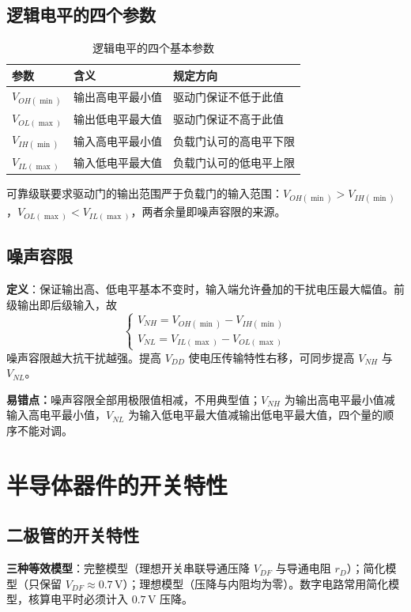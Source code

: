 \subsection{逻辑电平的四个参数}
\begin{table}[!htbp]
    \centering
    \caption{逻辑电平的四个基本参数}
    \begin{tabular}{lll}
        \toprule
        参数 & 含义 & 规定方向 \\
        \midrule
        \(V_{OH(\min)}\) & 输出高电平最小值 & 驱动门保证不低于此值 \\
        \(V_{OL(\max)}\) & 输出低电平最大值 & 驱动门保证不高于此值 \\
        \(V_{IH(\min)}\) & 输入高电平最小值 & 负载门认可的高电平下限 \\
        \(V_{IL(\max)}\) & 输入低电平最大值 & 负载门认可的低电平上限 \\
        \bottomrule
    \end{tabular}
\end{table}
可靠级联要求驱动门的输出范围严于负载门的输入范围：\(V_{OH(\min)}>V_{IH(\min)}\)，\(V_{OL(\max)}<V_{IL(\max)}\)，两者余量即噪声容限的来源。

\subsection{噪声容限}
\textbf{定义}：保证输出高、低电平基本不变时，输入端允许叠加的干扰电压最大幅值。前级输出即后级输入，故
\[
\begin{cases}
V_{NH}=V_{OH(\min)}-V_{IH(\min)}\\[4pt]
V_{NL}=V_{IL(\max)}-V_{OL(\max)}
\end{cases}
\]
噪声容限越大抗干扰越强。提高 \(V_{DD}\) 使电压传输特性右移，可同步提高 \(V_{NH}\) 与 \(V_{NL}\)。

\textbf{易错点：}噪声容限全部用极限值相减，不用典型值；\(V_{NH}\) 为输出高电平最小值减输入高电平最小值，\(V_{NL}\) 为输入低电平最大值减输出低电平最大值，四个量的顺序不能对调。

\section{半导体器件的开关特性}
\subsection{二极管的开关特性}
\textbf{三种等效模型}：完整模型（理想开关串联导通压降 \(V_{DF}\) 与导通电阻 \(r_D\)）；简化模型（只保留 \(V_{DF}\approx0.7\,\mathrm{V}\)）；理想模型（压降与内阻均为零）。数字电路常用简化模型，核算电平时必须计入 \(0.7\,\mathrm{V}\) 压降。

